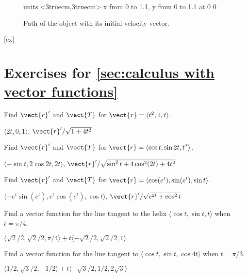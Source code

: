 \begin{figure}[H]
\centerline{
\vbox{\beginpicture
\normalgraphs
\setcoordinatesystem units <3truecm,3truecm>
\setplotarea x from 0 to 1.1, y from 0 to 1.1
 at 0 0
\endpicture}}
\caption{Path of the object with its initial velocity vector. \label{fig:velocity cos sin cos}}
\end{figure}


[ex]
\section*{Exercises for \ref{sec:calculus with vector functions}}

\begin{enumialphparenastyle}

\begin{ex}
Find $\vect{r}'$ and $\vect{T}$ for
$\vect{r} = \langle t^2,1,t\rangle$.
\begin{sol}
	$\langle 2t,0,1\rangle$, $\vect{r}'/\sqrt{1+4t^2}$
\end{sol}
\end{ex}

\begin{ex}
Find $\vect{r}'$ and $\vect{T}$ for
$\vect{r} = \langle \cos t, \sin 2t, t^2\rangle$.
\begin{sol}
	$\langle -\sin t, 2\cos 2t,2t\rangle$,
	$\vect{r}'/\sqrt{\sin^2t + 4\cos^2(2t)+4t^2}$
\end{sol}
\end{ex}

\begin{ex}
Find $\vect{r}'$ and $\vect{T}$ for
$\vect{r} = \langle \cos(e^t),\sin(e^t),\sin t\rangle$.
\begin{sol} $\langle -e^t\sin(e^t),e^t\cos(e^t),\cos t\rangle$,
$\vect{r}'/\sqrt{e^{2t}+\cos^2 t}$
\end{sol}
\end{ex}

\begin{ex}
Find a vector function for the line tangent to the helix
$\langle \cos t,\sin t, t\rangle$ when $t=\pi/4$.
\begin{sol} $\langle \sqrt2/2,\sqrt2/2,\pi/4\rangle+
t\langle -\sqrt2/2,\sqrt2/2,1\rangle$
\end{sol}
\end{ex}

\begin{ex}
Find a vector function for the line tangent to 
$\langle \cos t,\sin t, \cos 4t \rangle$ when $t=\pi/3$.
\begin{sol} $\langle 1/2,\sqrt3/2,-1/2\rangle+
t\langle -\sqrt3/2,1/2,2\sqrt3\rangle$
\end{sol}
\end{ex}


\end{enumialphparenastyle}
